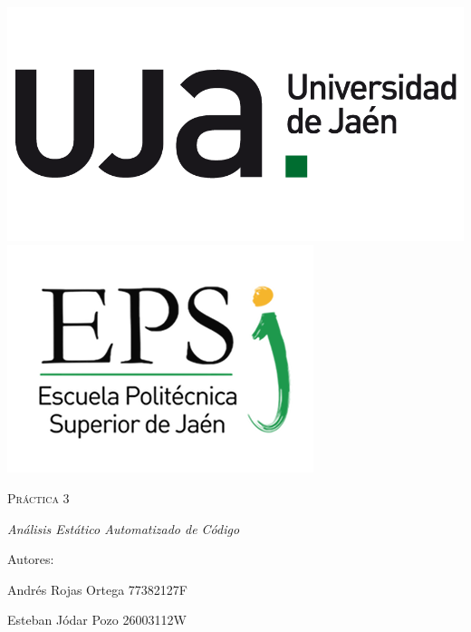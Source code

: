 	\begin{titlepage}
		\centering
		{\includegraphics[scale=0.2]{img/np_UJA_generica_6.png}
		\includegraphics[scale=0.35]{img/Logo_EPS.png}}
		\vspace{1cm}
		{\scshape\Huge Práctica 3 \par}
		\vspace{3cm}
		{\itshape\Large Análisis Estático Automatizado de Código \par}
		\vfill
		{\Large Autores: \par}
		{\Large Andrés Rojas Ortega 77382127F\par}
		{\Large Esteban Jódar Pozo 26003112W\par}
		\vfill
	\end{titlepage}

	\paragraph{}
	\paragraph{}
	
	\tableofcontents
	
	\newpage
